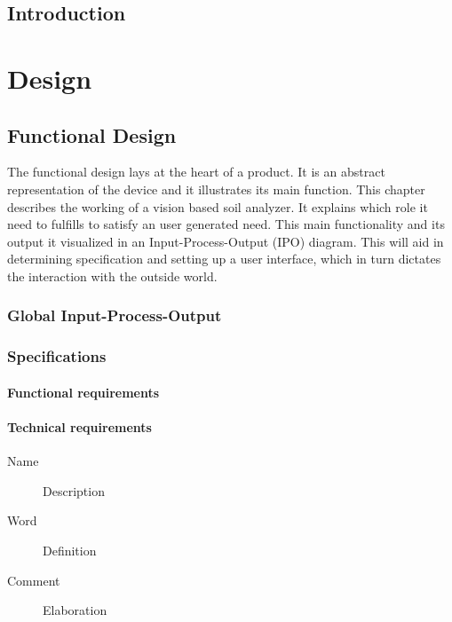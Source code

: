 \documentclass[11pt,fleqn,,a4paper,twoside,openright]{book}
\begin{document}
\cleardoublepage %

\pagestyle{fancy} %

\chapter{Introduction}


\newpage
\part{Design}

\chapter{Functional Design}
The functional design lays at the heart of a product. It is an abstract representation of the device and it illustrates its main function. This chapter describes the working of a vision based soil analyzer. It explains which role it need to fulfills to satisfy an user generated need. This main functionality and its output it visualized in an Input-Process-Output (IPO) diagram. This will aid in determining specification and setting up a user interface, which in turn dictates the interaction with the outside world.

\section{Global Input-Process-Output}


\section{Specifications}\label{Specification}


\subsection{Functional requirements}\label{FunctionalRequirements}


\subsection{Technical requirements}\label{TechnicalRequirements}
\begin{description}
\item[Name] Description
\item[Word] Definition
\item[Comment] Elaboration
\end{description}
\end{document}
